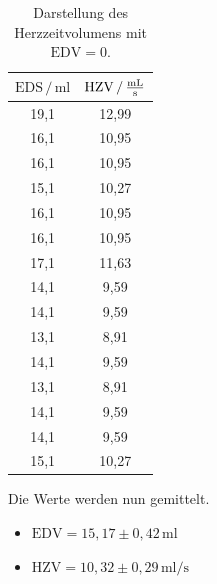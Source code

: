 \begin{table}[H]
  \centering
  \caption{Darstellung des Herzzeitvolumens mit $\text{EDV} =0$.}
  \label{tab:7}
  \begin{tabular}{c c}
    \toprule
     $\text{EDS}\,/\,\si{\milli\litre}$ &
     $\text{HZV} \,/\, \si[per-mode=fraction]{\milli\litre\per\second}$ \\
     \midrule
      19,1 & 12,99 \\
      16,1 & 10,95\\
      16,1 & 10,95\\
      15,1 & 10,27\\
      16,1 & 10,95\\
      16,1 & 10,95\\
      17,1 & 11,63\\
      14,1 & 9,59\\
      14,1 & 9,59\\
      13,1 & 8,91\\
      14,1 & 9,59\\
      13,1 & 8,91\\
      14,1 & 9,59\\
      14,1 & 9,59\\
      15,1 & 10,27\\
     \bottomrule
  \end{tabular}
\end{table}
Die Werte werden nun gemittelt.
\begin{itemize}
  \item $\text{EDV} = 15,17 \pm 0,42\, \si{\milli\litre}$
  \item $\text{HZV} = 10,32 \pm 0,29\, \si{\milli\litre\per\second}$
\end{itemize}
